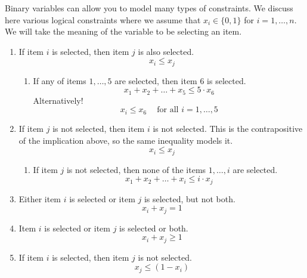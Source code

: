 Binary variables can allow you to model many types of constraints.  We discuss here various logical constraints where we assume that $x_i \in \{0,1\}$ for $i=1, \dots, n$.  We will take the meaning of the variable to be selecting an item.

\begin{enumerate}
 \item If item $i$ is selected, then item $j$ is also selected.
 \begin{equation}
 x_i \leq x_j
 \end{equation}
 \begin{enumerate}
 \item If any of items $1, \dots, 5$ are selected, then item $6$ is selected.
 \begin{equation}
 x_1 + x_2 + \dots + x_5 \leq 5 \cdot x_6
 \end{equation}
 Alternatively!
 \begin{equation}
 x_i \leq x_6 \ \ \ \ \text{ for all } i=1, \dots, 5
 \end{equation}
 \end{enumerate}
 \item If item $j$ is not selected, then item $i$ is not selected.  This is the contrapositive of the implication above, so the same inequality models it.
 \begin{equation}
x_i \leq x_j
 \end{equation}
  \begin{enumerate}
 \item If item $j$ is not selected, then none of the items $1, \dots, i$ are selected.
 \begin{equation}
 x_1 + x_2 + \dots + x_i \leq i \cdot x_j
 \end{equation}
 \end{enumerate}
\item Either item $i$ is selected or item $j$ is selected, but not both.
 \begin{equation}
 x_i + x_j = 1
 \end{equation}
\item Item $i$ is selected or item $j$ is selected or both.
 \begin{equation}
 x_i + x_j \geq 1
 \end{equation}
\item If item $i$ is selected, then item $j$ is not selected.
 \begin{equation}
x_j \leq (1-x_i)
 \end{equation}


\end{enumerate}
